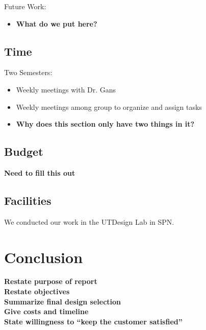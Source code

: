 \documentclass[letterpaper,12pt]{article}
\newcommand{\xxx}[1]{{\color{red}\bf #1}}
\begin{document}
Future Work:
\begin{itemize}
    \item \xxx{What do we put here?}
\end{itemize}

\subsection{Time}
Two Semesters:
\begin{itemize}
    \item Weekly meetings with Dr. Gans
    \item Weekly meetings among group to organize and assign tasks
    \item \xxx{Why does this section only have two things in it?}
\end{itemize}

\subsection{Budget}
\xxx{Need to fill this out}

\subsection{Facilities}
We conducted our work in the UTDesign Lab in SPN.

\section{Conclusion}
\label{sec:conclusion}

\xxx{Restate purpose of report} \\
\xxx{Restate objectives} \\
\xxx{Summarize final design selection} \\
\xxx{Give costs and timeline} \\
\xxx{State willingness to ``keep the customer satisfied''}
\end{document}
